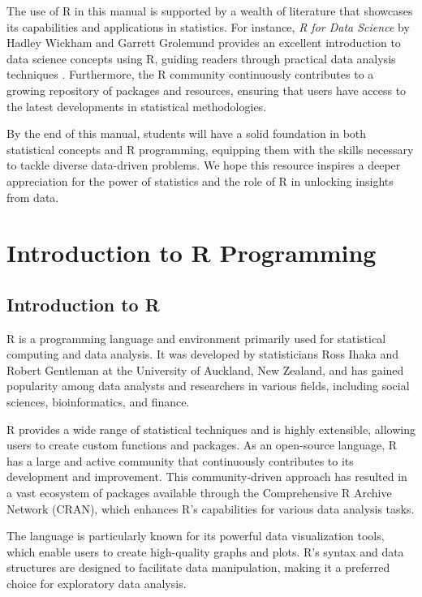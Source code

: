 \documentclass[10pt]{book}
\begin{document}
The use of R in this manual is supported by a wealth of literature that showcases its capabilities and applications in statistics. For instance, \textit{R for Data Science} by Hadley Wickham and Garrett Grolemund provides an excellent introduction to data science concepts using R, guiding readers through practical data analysis techniques \cite{wickham2017r}. Furthermore, the R community continuously contributes to a growing repository of packages and resources, ensuring that users have access to the latest developments in statistical methodologies.

By the end of this manual, students will have a solid foundation in both statistical concepts and R programming, equipping them with the skills necessary to tackle diverse data-driven problems. We hope this resource inspires a deeper appreciation for the power of statistics and the role of R in unlocking insights from data.




\chapter{Introduction to R Programming}

\section{Introduction to R}

R is a programming language and environment primarily used for statistical computing and data analysis. It was developed by statisticians Ross Ihaka and Robert Gentleman at the University of Auckland, New Zealand, and has gained popularity among data analysts and researchers in various fields, including social sciences, bioinformatics, and finance.

R provides a wide range of statistical techniques and is highly extensible, allowing users to create custom functions and packages. As an open-source language, R has a large and active community that continuously contributes to its development and improvement. This community-driven approach has resulted in a vast ecosystem of packages available through the Comprehensive R Archive Network (CRAN), which enhances R's capabilities for various data analysis tasks.

The language is particularly known for its powerful data visualization tools, which enable users to create high-quality graphs and plots. R's syntax and data structures are designed to facilitate data manipulation, making it a preferred choice for exploratory data analysis.
\end{document}

